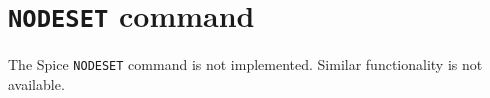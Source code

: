 \section{{\tt NODESET} command}
The Spice {\tt NODESET} command is not implemented.  Similar
functionality is not available.
